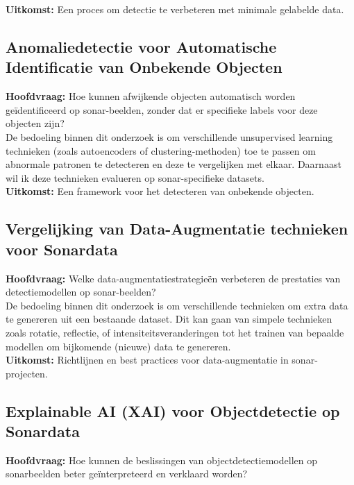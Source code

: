 \textbf{Uitkomst:} Een proces om detectie te verbeteren met minimale gelabelde data.

\subsection{Anomaliedetectie voor Automatische Identificatie van Onbekende Objecten}

\textbf{Hoofdvraag:} Hoe kunnen afwijkende objecten automatisch worden geïdentificeerd op sonar-beelden, zonder dat er specifieke labels voor deze objecten zijn? \\

De bedoeling binnen dit onderzoek is om verschillende unsupervised learning technieken (zoals autoencoders of clustering-methoden) toe te passen om abnormale patronen te detecteren en deze te vergelijken met elkaar. Daarnaast wil ik deze technieken evalueren op sonar-specifieke datasets. \\

\textbf{Uitkomst:} Een framework voor het detecteren van onbekende objecten.

\subsection{Vergelijking van Data-Augmentatie technieken voor Sonardata}

\textbf{Hoofdvraag:} Welke data-augmentatiestrategieën verbeteren de prestaties van detectiemodellen op sonar-beelden? \\

De bedoeling binnen dit onderzoek is om verschillende technieken om extra data te genereren uit een bestaande dataset. Dit kan gaan van simpele technieken zoals rotatie, reflectie, of intensiteitsveranderingen tot het trainen van bepaalde modellen om bijkomende (nieuwe) data te genereren. \\

\textbf{Uitkomst:} Richtlijnen en best practices voor data-augmentatie in sonar-projecten.

\subsection{Explainable AI (XAI) voor Objectdetectie op Sonardata}

\textbf{Hoofdvraag:} Hoe kunnen de beslissingen van objectdetectiemodellen op sonarbeelden beter geïnterpreteerd en verklaard worden? \\

